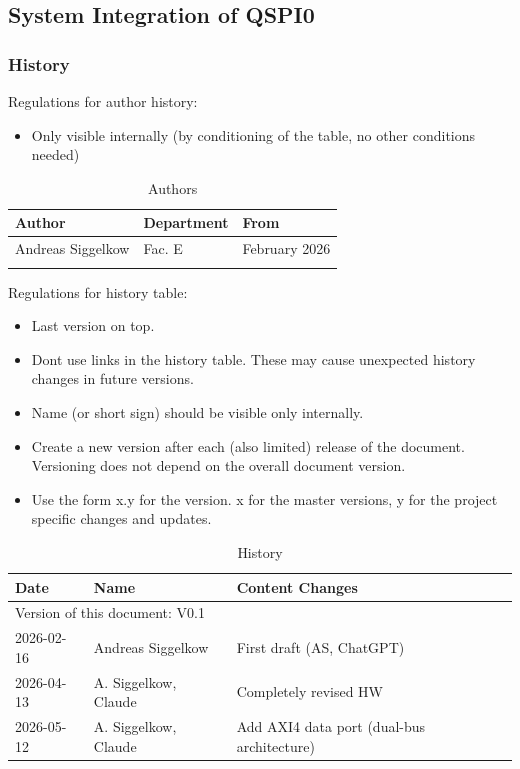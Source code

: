 
\label{sec:qspifunc01}

\subsection{System Integration of QSPI0}
\subsubsection{History}
Regulations for author history:
\begin{itemize}
  \item Only visible internally (by conditioning of the table, no other conditions needed)
\end{itemize}

\begin{table}[H]
\caption{Authors}
\label{tab:gpioauth01a}
\centering
\begin{tabularx}{\textwidth}{|X |X |X |}
  \hline
  Author & Department & From \\
  \hline
  \hline
  Andreas Siggelkow & Fac. E & February 2026 \\
  \hline
  && \\
  \hline
\end{tabularx}
\end{table}

Regulations for history table:
\begin{itemize}
  \item Last version on top.
  \item Dont use links in the history table. These may cause unexpected history changes in future versions.
  \item Name (or short sign) should be visible only internally.
  \item Create a new version after each (also limited) release of the document. Versioning does not depend on the overall document version.
  \item Use the form x.y for the version. x for the master versions, y for the project specific changes and updates.
\end{itemize}

\begin{table}[H]
\caption{History}
\label{tab:gpiohistory01a}
\centering
\begin{tabularx}{\textwidth}{|X |X |X |}
  \hline
  Date & Name & Content Changes \\
  \hline
  \multicolumn{3}{|l|}{Version of this document: V0.1} \\
  \hline
  2026-02-16 & Andreas Siggelkow & First draft (AS, ChatGPT) \\
  \hline
  2026-04-13 & A. Siggelkow, Claude & Completely revised HW \\
  \hline
  2026-05-12 & A. Siggelkow, Claude & Add AXI4 data port (dual-bus architecture) \\
  \hline
\end{tabularx}
\end{table}

